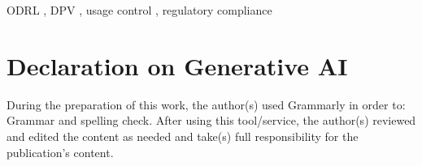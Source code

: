 \documentclass{ceurart}
\begin{document}
\begin{keywords}
  ODRL \sep
  DPV \sep
  usage control \sep
  regulatory compliance
\end{keywords}

\maketitle




% 




\section*{Declaration on Generative AI}
During the preparation of this work, the author(s) used Grammarly in order to: Grammar and spelling check. After using this tool/service, the author(s) reviewed and edited the content as needed and take(s) full responsibility for the publication's content.


\end{document}
